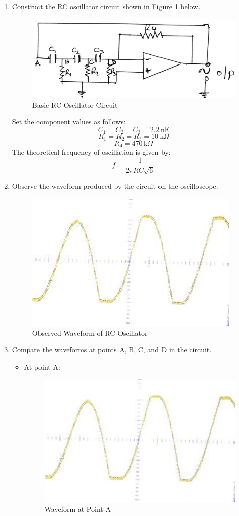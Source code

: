 \documentclass[12pt,a4paper]{article}
\begin{document}
    \begin{enumerate}
        \item Construct the RC oscillator circuit shown in Figure \ref{fig:1} below.
        \begin{figure}[H]
            \centering
            \includegraphics[width=0.5\linewidth]{circuit1_1.jpeg}
            \caption{Basic RC Oscillator Circuit}
            \label{fig:1}
        \end{figure}
        
        Set the component values as follows:
        \[
        C_1 = C_2 = C_3 = 2.2 \, \text{nF}
        \]
        \[
        R_1 = R_2 = R_3 = 10 \, \text{k} \Omega
        \]
        \[
        R_4 = 470 \, \text{k} \Omega
        \]
        The theoretical frequency of oscillation is given by:
        \[
        f = \frac{1}{2 \pi RC \sqrt{6}}
        \]
        
        \item Observe the waveform produced by the circuit on the oscilloscope.
        \begin{figure}[H]
            \centering
            \includegraphics[width=0.5\linewidth]{1.jpeg}
            \caption{Observed Waveform of RC Oscillator}
            \label{fig:enter-label}
        \end{figure}
        
        \item Compare the waveforms at points A, B, C, and D in the circuit.
        
        \begin{itemize}
            \item At point A:
            \begin{figure}[H]
                \centering
                \includegraphics[width=0.5\linewidth]{1.jpeg}
                \caption{Waveform at Point A}
                \label{fig:enter-label}
            \end{figure}
            

\end{itemize}
\end{enumerate}
\end{document}
